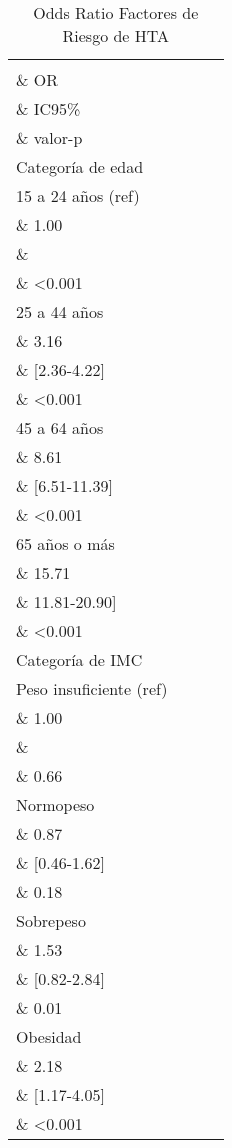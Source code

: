\documentclass{aa}
\begin{document}
\begin{table}[b]
\caption{\small Odds Ratio Factores de Riesgo de HTA}
    \centering
    \small
\begin{tabular}{lrcr}
\toprule
  \\\& OR \\\& IC95\% \\\& valor-p\\
\midrule
Categoría de edad\\
\-\hspace{5mm} \tiny  15 a 24 años (ref) \\\& 1.00 \\\& \\\& <0.001\\
\-\hspace{5mm} \tiny  25 a 44 años \\\& 3.16 \\\& [2.36-4.22] \\\& <0.001\\
\-\hspace{5mm} \tiny  45 a 64 años \\\& 8.61 \\\& [6.51-11.39] \\\& <0.001\\
\-\hspace{5mm} \tiny  65 años o más \\\& 15.71 \\\& 11.81-20.90] \\\& <0.001\\
\addlinespace
Categoría de IMC\\
\-\hspace{5mm} \tiny  Peso insuficiente (ref) \\\& 1.00 \\\&  \\\& 0.66\\
\-\hspace{5mm} \tiny  Normopeso \\\& 0.87 \\\& [0.46-1.62] \\\& 0.18\\
\-\hspace{5mm} \tiny  Sobrepeso \\\& 1.53 \\\& [0.82-2.84] \\\& 0.01\\
\-\hspace{5mm} \tiny  Obesidad \\\& 2.18 \\\& [1.17-4.05] \\\& <0.001\\

\end{tabular}
\end{table}
\end{document}
